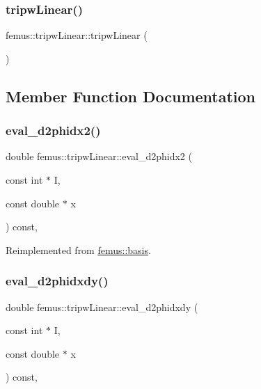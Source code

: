 \subsubsection{\texorpdfstring{tripw\+Linear()}{tripwLinear()}}
{\footnotesize\ttfamily femus\+::tripw\+Linear\+::tripw\+Linear (\begin{DoxyParamCaption}{ }\end{DoxyParamCaption})\hspace{0.3cm}{\ttfamily [inline]}}



\subsection{Member Function Documentation}
\mbox{\label{classfemus_1_1tripw_linear_aee89b7d0da7add34b1b8fe8b74feb8b1}} 
\subsubsection{\texorpdfstring{eval\+\_\+d2phidx2()}{eval\_d2phidx2()}}
{\footnotesize\ttfamily double femus\+::tripw\+Linear\+::eval\+\_\+d2phidx2 (\begin{DoxyParamCaption}\item[{const int $\ast$}]{I,  }\item[{const double $\ast$}]{x }\end{DoxyParamCaption}) const\hspace{0.3cm}{\ttfamily [inline]}, {\ttfamily [virtual]}}



Reimplemented from \mbox{\hyperlink{classfemus_1_1basis_a0a9839e75d1c9c8302486fc072eed028}{femus\+::basis}}.

\mbox{\label{classfemus_1_1tripw_linear_ae9ae33080ac87b5f0f4bcb69859095a4}} 
\subsubsection{\texorpdfstring{eval\+\_\+d2phidxdy()}{eval\_d2phidxdy()}}
{\footnotesize\ttfamily double femus\+::tripw\+Linear\+::eval\+\_\+d2phidxdy (\begin{DoxyParamCaption}\item[{const int $\ast$}]{I,  }\item[{const double $\ast$}]{x }\end{DoxyParamCaption}) const\hspace{0.3cm}{\ttfamily [inline]}, {\ttfamily [virtual]}}



